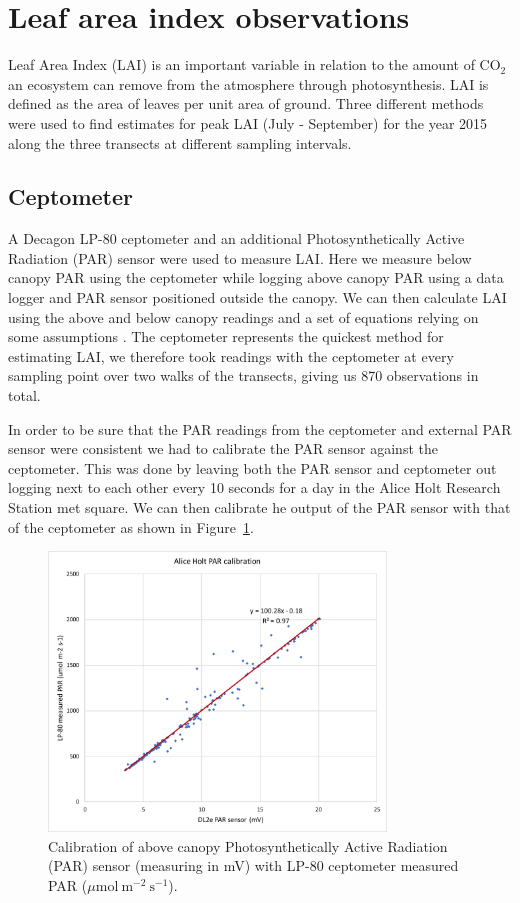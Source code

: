 \section{Leaf area index observations}

Leaf Area Index (LAI) is an important variable in relation to the amount of CO\(_2\) an ecosystem can remove from the atmosphere through photosynthesis. LAI is defined as the area of leaves per unit area of ground. Three different methods were used to find estimates for peak LAI (July - September) for the year 2015 along the three transects at different sampling intervals.

\subsection{Ceptometer}

A Decagon LP-80 ceptometer and an additional Photosynthetically Active Radiation (PAR) sensor were used to measure LAI. Here we measure below canopy PAR using the ceptometer while logging above canopy PAR using a data logger and PAR sensor positioned outside the canopy. We can then calculate LAI using the above and below canopy readings and a set of equations relying on some assumptions \citep{fassnacht1994comparison}. The ceptometer represents the quickest method for estimating LAI, we therefore took readings with the ceptometer at every sampling point over two walks of the transects, giving us 870 observations in total.

In order to be sure that the PAR readings from the ceptometer and external PAR sensor were consistent we had to calibrate the PAR sensor against the ceptometer. This was done by leaving both the PAR sensor and ceptometer out logging next to each other every 10 seconds for a day in the Alice Holt Research Station met square. We can then calibrate he output of the PAR sensor with that of the ceptometer as shown in Figure~\ref{chap4:fig:par_calib}. 

\begin{figure}[ht]
    \centering
    \includegraphics[width=0.8\textwidth]{chapter/chapter4/AH_PAR.pdf}
    \caption{Calibration of above canopy Photosynthetically Active Radiation (PAR) sensor (measuring in mV) with LP-80 ceptometer measured PAR (\(\mu \text{mol}~\text{m}^{-2}~\text{s}^{-1} \)).} \label{chap4:fig:par_calib}
\end{figure}


